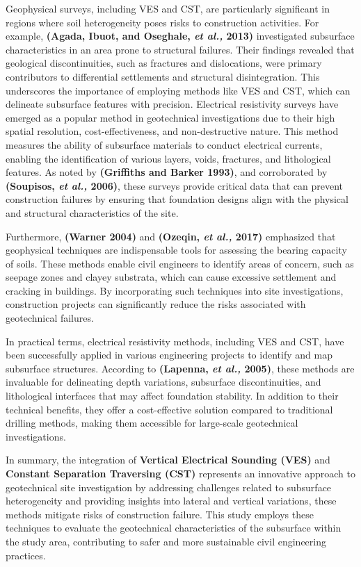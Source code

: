 \documentclass[12pt,a4paper]{report}
\begin{document}
Geophysical surveys, including VES and CST, are particularly significant in regions where soil heterogeneity poses risks to construction activities. For example, \textbf{(Agada, Ibuot, and Oseghale, \textit{et al.,} 2013)} investigated subsurface characteristics in an area prone to structural failures. Their findings revealed that geological discontinuities, such as fractures and dislocations, were primary contributors to differential settlements and structural disintegration. This underscores the importance of employing methods like VES and CST, which can delineate subsurface features with precision. Electrical resistivity surveys have emerged as a popular method in geotechnical investigations due to their high spatial resolution, cost-effectiveness, and non-destructive nature. This method measures the ability of subsurface materials to conduct electrical currents, enabling the identification of various layers, voids, fractures, and lithological features. As noted by \textbf{(Griffiths and Barker 1993)}, and corroborated by \textbf{(Soupisos, \textit{et al.,} 2006)}, these surveys provide critical data that can prevent construction failures by ensuring that foundation designs align with the physical and structural characteristics of the site.

Furthermore, \textbf{(Warner 2004)} and \textbf{(Ozeqin, \textit{et al.,} 2017)} emphasized that geophysical techniques are indispensable tools for assessing the bearing capacity of soils. These methods enable civil engineers to identify areas of concern, such as seepage zones and clayey substrata, which can cause excessive settlement and cracking in buildings. By incorporating such techniques into site investigations, construction projects can significantly reduce the risks associated with geotechnical failures.

In practical terms, electrical resistivity methods, including VES and CST, have been successfully applied in various engineering projects to identify and map subsurface structures. According to \textbf{(Lapenna, \textit{et al.,} 2005)}, these methods are invaluable for delineating depth variations, subsurface discontinuities, and lithological interfaces that may affect foundation stability. In addition to their technical benefits, they offer a cost-effective solution compared to traditional drilling methods, making them accessible for large-scale geotechnical investigations.

In summary, the integration of \textbf{Vertical Electrical Sounding (VES)} and \textbf{Constant Separation Traversing (CST)} represents an innovative approach to geotechnical site investigation by addressing challenges related to subsurface heterogeneity and providing insights into lateral and vertical variations, these methods mitigate risks of construction failure. This study employs these techniques to evaluate the geotechnical characteristics of the subsurface within the study area, contributing to safer and more sustainable civil engineering practices.
\end{document}
